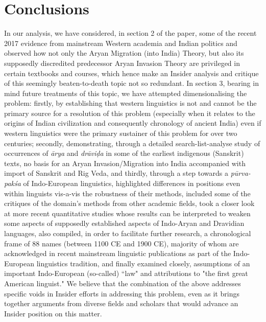 \section{Conclusions}

In our analysis, we have considered, in section 2 of the paper, some of the recent 2017 evidence from mainstream Western academia and Indian politics and observed how not only the Aryan Migration (into India) Theory, but also its supposedly discredited predecessor Aryan Invasion Theory are privileged in certain textbooks and courses, which hence make an Insider analysis and critique of this seemingly beaten-to-death topic not so redundant. In section 3, bearing in mind future treatments of this topic, we have attempted dimensionalising the problem: firstly, by establishing that western linguistics is not and cannot be the primary source for a resolution of this problem (especially when it relates to the origins of Indian civilization and consequently chronology of ancient India) even if western linguistics were the primary sustainer of this problem for over two centuries; secondly, demonstrating, through a detailed search-list-analyse study of occurrences of \textit{ārya} and \textit{drāviḍa} in some of the earliest indigenous (Sanskrit) texts, no basis for an Aryan Invasion/Migration into India accompanied with import of Sanskrit and Rig Veda, and thirdly, through a step towards a \textit{pūrva-pakśa} of Indo-European linguistics, highlighted differences in positions even within linguists vis-a-vis the robustness of their methods, included some of the critiques of the domain's methods from other academic fields, took a closer look at more recent quantitative studies whose results can be interpreted to weaken some aspects of supposedly established aspects of Indo-Aryan and Dravidian languages, also compiled, in order to facilitate further research, a chronological frame of 88 names (between 1100 CE and 1900 CE), majority of whom are acknowledged in recent mainstream linguistic publications as part of the Indo-European linguistics tradition, and finally examined closely, assumptions of an important Indo-European (so-called) ``law" and attributions to "the first great American linguist." We believe that the combination of the above addresses specific voids in Insider efforts in addressing this problem, even as it brings together arguments from diverse fields and scholars that would advance an Insider position on this matter.

